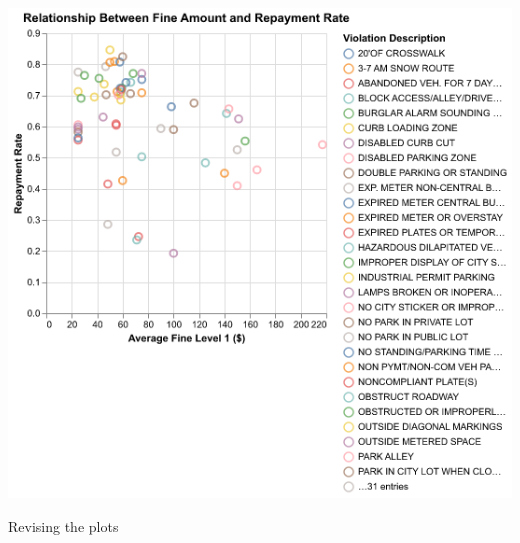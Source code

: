 \documentclass[
  letterpaper,
  DIV=11,
  numbers=noendperiod]{scrartcl}
\begin{document}
\includegraphics{ps2_answers_files/figure-pdf/cell-25-output-1.png}

Revising the plots
\end{document}

